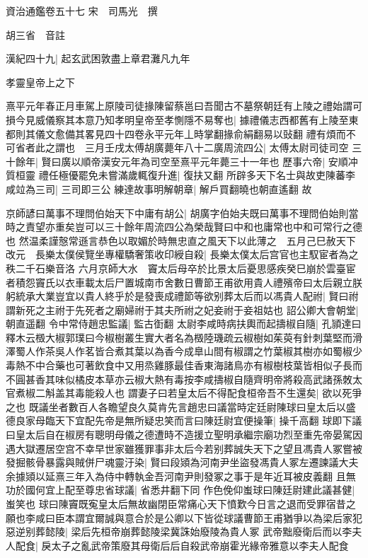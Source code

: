資治通鑑卷五十七
宋　司馬光　撰

胡三省　音註

漢紀四十九|{
	起玄武困敦盡上章君灘凡九年}


孝靈皇帝上之下

熹平元年春正月車駕上原陵司徒掾陳留蔡邕曰吾聞古不墓祭朝廷有上陵之禮始謂可損今見威儀察其本意乃知孝明皇帝至孝惻隱不易奪也|{
	據禮儀志西都舊有上陵至東都則其儀文愈備其畧見四十四卷永平元年丄時掌翻掾俞絹翻易以䜴翻}
禮有煩而不可省者此之謂也　三月壬戌太傅胡廣薨年八十二廣周流四公|{
	太傅太尉司徒司空}
三十餘年|{
	賢曰廣以順帝漢安元年為司空至熹平元年薨三十一年也}
歷事六帝|{
	安順冲質桓靈}
禮任極優罷免未嘗滿歲輒復升進|{
	復扶又翻}
所辟多天下名士與故吏陳蕃李咸竝為三司|{
	三司即三公}
練達故事明解朝章|{
	解戶買翻曉也朝直遙翻}
故

京師諺曰萬事不理問伯始天下中庸有胡公|{
	胡廣字伯始夫既曰萬事不理問伯始則當時之責望亦重矣豈可以三十餘年周流四公為榮哉賢曰中和也庸常也中和可常行之德也}
然温柔謹慤常遜言恭色以取媚於時無忠直之風天下以此薄之　五月己巳赦天下改元　長樂太僕侯覽坐專權驕奢策收印綬自殺|{
	長樂太僕太后宫官也主馭宦者為之秩二千石樂音洛}
六月京師大水　竇太后母卒於比景太后憂思感疾癸巳崩於雲臺宦者積怨竇氏以衣車載太后尸置城南市舍數日曹節王甫欲用貴人禮殯帝曰太后親立朕躬統承大業豈宜以貴人終乎於是發喪成禮節等欲别葬太后而以馮貴人配祔|{
	賢曰祔謂新死之主祔于先死者之廟婦祔于其夫所祔之妃妾祔于妾祖姑也}
詔公卿大會朝堂|{
	朝直遥翻}
令中常侍趙忠監議|{
	監古衘翻}
太尉李咸時病扶輿而起擣椒自隨|{
	孔頴達曰釋木云檓大椒郭璞曰今椒樹叢生實大者名為檓陸璣疏云椒樹如茱萸有針刺葉堅而滑澤蜀人作茶吳人作茗皆合煮其葉以為香今成臯山間有椒謂之竹葉椒其樹亦如蜀椒少毒熱不中合藥也可著飲食中又用烝雞豚最佳香東海諸鳥亦有椒樹枝葉皆相似子長而不圓甚香其味似橘皮本草亦云椒大熱有毒按李咸擣椒自隨齊明帝將殺高武諸孫敇太官煮椒二斛盖其毒能殺人也}
謂妻子曰若皇太后不得配食桓帝吾不生還矣|{
	欲以死爭之也}
既議坐者數百人各瞻望良久莫肯先言趙忠曰議當時定廷尉陳球曰皇太后以盛德良家母臨天下宜配先帝是無所疑忠笑而言曰陳廷尉宜便操筆|{
	操千高翻}
球即下議曰皇太后自在椒房有聰明母儀之德遭時不造援立聖明承繼宗廟功烈至重先帝晏駕因遇大獄遷居空宫不幸早世家雖獲罪事非太后今若别葬誠失天下之望且馮貴人冢嘗被發掘骸骨暴露與賊併尸魂靈汙染|{
	賢曰段熲為河南尹坐盜發馮貴人冢左遷諫議大夫余據熲以延熹三年入為侍中轉執金吾河南尹則發冢之事于是年近耳被皮義翻}
且無功於國何宜上配至尊忠省球議|{
	省悉井翻下同}
作色俛仰蚩球曰陳廷尉建此議甚健|{
	蚩笑也}
球曰陳竇既寃皇太后無故幽閉臣常痛心天下憤歎今日言之退而受罪宿昔之願也李咸曰臣本謂宜爾誠與意合於是公卿以下皆從球議曹節王甫猶爭以為梁后家犯惡逆别葬懿陵|{
	梁后先桓帝崩葬懿陵梁冀誅始廢陵為貴人冢}
武帝黜廢衛后而以李夫人配食|{
	戾太子之亂武帝策廢其母衛后后自殺武帝崩霍光緣帝雅意以李夫人配食}
